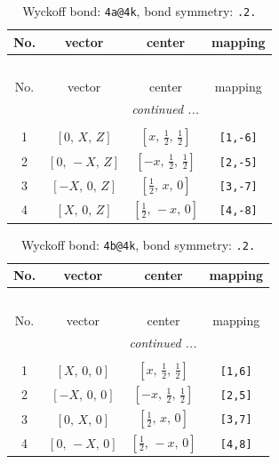 \documentclass[fleqn,8pt]{jsarticle}
\begin{document}
\begin{longtable}{cccc}
\caption{Wyckoff bond: {\tt 4a@4k}, bond symmetry: {\tt .2.}}
 \\
 \hline \hline
No. & vector & center & mapping \\ \hline \endfirsthead

\multicolumn{3}{l}{\tablename\ \thetable{}} \\
 \hline \hline
No. & vector & center & mapping \\ \hline \endhead

 \hline \hline
\multicolumn{3}{r}{\footnotesize\it continued ...} \\ \endfoot

 \hline \hline
\multicolumn{3}{r}{} \\ \endlastfoot

1 & $\left[ 0,\, X,\, Z \right]$ & $\left[ x,\, \frac{1}{2},\, \frac{1}{2} \right]$ & {\tt [1,-6]} \\ \hline
2 & $\left[ 0,\, - X,\, Z \right]$ & $\left[ - x,\, \frac{1}{2},\, \frac{1}{2} \right]$ & {\tt [2,-5]} \\ \hline
3 & $\left[ - X,\, 0,\, Z \right]$ & $\left[ \frac{1}{2},\, x,\, 0 \right]$ & {\tt [3,-7]} \\ \hline
4 & $\left[ X,\, 0,\, Z \right]$ & $\left[ \frac{1}{2},\, - x,\, 0 \right]$ & {\tt [4,-8]} \\
\end{longtable}
\renewcommand{\arraystretch}{1.2}
\begin{longtable}{cccc}
\caption{Wyckoff bond: {\tt 4b@4k}, bond symmetry: {\tt .2.}}
 \\
 \hline \hline
No. & vector & center & mapping \\ \hline \endfirsthead

\multicolumn{3}{l}{\tablename\ \thetable{}} \\
 \hline \hline
No. & vector & center & mapping \\ \hline \endhead

 \hline \hline
\multicolumn{3}{r}{\footnotesize\it continued ...} \\ \endfoot

 \hline \hline
\multicolumn{3}{r}{} \\ \endlastfoot

1 & $\left[ X,\, 0,\, 0 \right]$ & $\left[ x,\, \frac{1}{2},\, \frac{1}{2} \right]$ & {\tt [1,6]} \\ \hline
2 & $\left[ - X,\, 0,\, 0 \right]$ & $\left[ - x,\, \frac{1}{2},\, \frac{1}{2} \right]$ & {\tt [2,5]} \\ \hline
3 & $\left[ 0,\, X,\, 0 \right]$ & $\left[ \frac{1}{2},\, x,\, 0 \right]$ & {\tt [3,7]} \\ \hline
4 & $\left[ 0,\, - X,\, 0 \right]$ & $\left[ \frac{1}{2},\, - x,\, 0 \right]$ & {\tt [4,8]} \\
\end{longtable}
\end{document}
